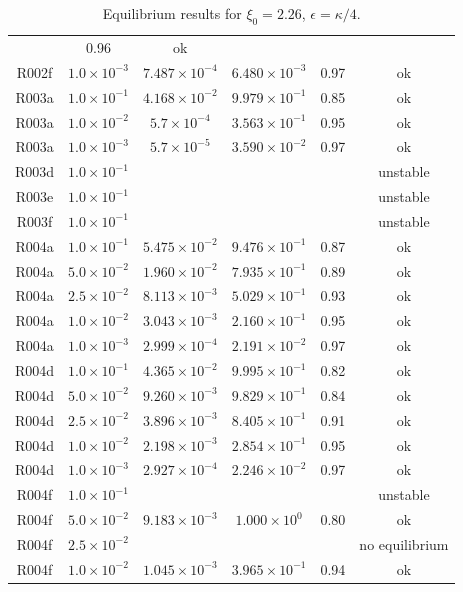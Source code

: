 \begin{table}
\begin{center}
\begin{tabular}{|c|c|c|c|c|c|}
      & 0.96 & ok \\
R002f &  $1.0\times 10^{-3}$ & $7.487\times 10^{-4}$ & $6.480\times10^{-3}$
      & 0.97 &  ok\\
\hline
R003a &  $1.0\times 10^{-1}$ & $4.168\times 10^{-2}$ & $9.979\times10^{-1}$
      & 0.85 & ok\\
R003a &  $1.0\times 10^{-2}$ & $5.7\times 10^{-4}$ & $3.563\times10^{-1}$
      & 0.95 & ok\\
R003a &  $1.0\times 10^{-3}$ & $5.7\times 10^{-5}$ & $3.590\times10^{-2}$
      & 0.97 & ok\\
\hline
R003d & $1.0\times 10^{-1}$& & & & unstable\\
R003e & $1.0\times 10^{-1}$& & & & unstable\\
R003f & $1.0\times 10^{-1}$& & & & unstable\\
\hline
R004a &  $1.0\times 10^{-1}$ & $5.475\times 10^{-2}$ & $9.476\times10^{-1}$
      & 0.87 & ok\\
R004a &  $5.0\times 10^{-2}$ & $1.960\times 10^{-2}$ & $7.935\times10^{-1}$
      & 0.89 & ok\\
R004a &  $2.5\times 10^{-2}$ & $8.113\times 10^{-3}$ & $5.029\times10^{-1}$
      & 0.93 & ok\\
R004a &  $1.0\times 10^{-2}$ & $3.043\times 10^{-3}$ & $2.160\times10^{-1}$
      & 0.95 & ok\\
R004a &  $1.0\times 10^{-3}$ & $2.999\times 10^{-4}$ & $2.191\times10^{-2}$
      & 0.97 & ok\\
\hline
R004d &  $1.0\times 10^{-1}$ & $4.365\times 10^{-2}$ & $9.995\times10^{-1}$
      & 0.82 & ok\\
R004d &  $5.0\times 10^{-2}$ & $9.260\times 10^{-3}$ & $9.829\times10^{-1}$
      & 0.84 & ok\\
R004d &  $2.5\times 10^{-2}$ & $3.896\times 10^{-3}$ & $8.405\times10^{-1}$
      & 0.91 & ok\\
R004d &  $1.0\times 10^{-2}$ & $2.198\times 10^{-3}$ & $2.854\times10^{-1}$
      & 0.95 & ok\\
R004d &  $1.0\times 10^{-3}$ & $2.927\times 10^{-4}$ & $2.246\times10^{-2}$
      & 0.97 & ok\\
\hline
R004f &  $1.0\times 10^{-1}$ &  &    &  & unstable\\
R004f &  $5.0\times 10^{-2}$ & $9.183\times 10^{-3}$ & $1.000\times10^{0}$
      & 0.80 & ok\\
R004f &  $2.5\times 10^{-2}$ & &   &  & no equilibrium\\
R004f &  $1.0\times 10^{-2}$ & $1.045\times 10^{-3}$ & $3.965\times10^{-1}$
      & 0.94 & ok\\
\hline
\end{tabular}
\label{table:xi226}
\caption{Equilibrium results for $\xi_0 = 2.26$, $\epsilon = \kappa/4$.}
\end{center}
\end{table}


